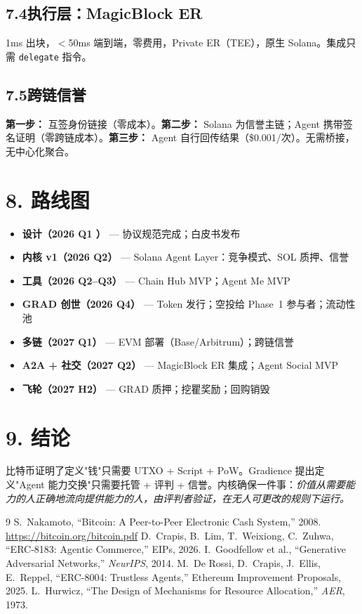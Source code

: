 \documentclass[11pt,a4paper]{article}
\begin{document}
\subsection{7.4\quad 执行层：MagicBlock ER}
1ms 出块，$<$50ms 端到端，零费用，Private ER（TEE），原生 Solana。集成只需 \texttt{delegate} 指令。

\subsection{7.5\quad 跨链信誉}
\textbf{第一步：} 互签身份链接（零成本）。\textbf{第二步：} Solana 为信誉主链；Agent 携带签名证明（零跨链成本）。\textbf{第三步：} Agent 自行回传结果（\$0.001/次）。无需桥接，无中心化聚合。

\section{8. 路线图}

\begin{itemize}[nosep]
  \item \textbf{设计（2026 Q1 \checkmark）} --- 协议规范完成；白皮书发布
  \item \textbf{内核 v1（2026 Q2）} --- Solana Agent Layer：竞争模式、SOL 质押、信誉
  \item \textbf{工具（2026 Q2--Q3）} --- Chain Hub MVP；Agent Me MVP
  \item \textbf{GRAD 创世（2026 Q4）} --- Token 发行；空投给 Phase~1 参与者；流动性池
  \item \textbf{多链（2027 Q1）} --- EVM 部署（Base/Arbitrum）；跨链信誉
  \item \textbf{A2A + 社交（2027 Q2）} --- MagicBlock ER 集成；Agent Social MVP
  \item \textbf{飞轮（2027 H2）} --- GRAD 质押；挖瞿奖励；回购销毁
\end{itemize}

\section{9. 结论}

比特币证明了定义"钱"只需要 UTXO + Script + PoW。Gradience 提出定义"Agent 能力交换"只需要托管 + 评判 + 信誉。内核确保一件事：\emph{价值从需要能力的人正确地流向提供能力的人，由评判者验证，在无人可更改的规则下运行。}

\begin{thebibliography}{9}
 S.~Nakamoto, ``Bitcoin: A Peer-to-Peer Electronic Cash System,'' 2008. \url{https://bitcoin.org/bitcoin.pdf}
 D.~Crapis, B.~Lim, T.~Weixiong, C.~Zuhwa, ``ERC-8183: Agentic Commerce,'' EIPs, 2026.
 I.~Goodfellow et al., ``Generative Adversarial Networks,'' \emph{NeurIPS}, 2014.
 M.~De Rossi, D.~Crapis, J.~Ellis, E.~Reppel, ``ERC-8004: Trustless Agents,'' Ethereum Improvement Proposals, 2025.
 L.~Hurwicz, ``The Design of Mechanisms for Resource Allocation,'' \emph{AER}, 1973.
\end{thebibliography}
\end{document}
